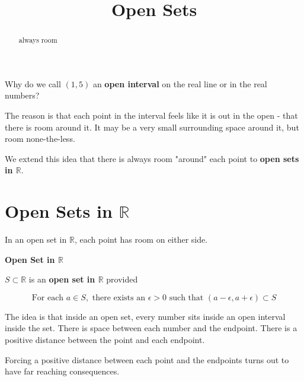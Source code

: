 \documentclass{ximera}
\title{Open Sets}
\begin{document}
\begin{abstract}
always room
\end{abstract}
\maketitle





Why do we call $(1, 5)$ an \textbf{open interval} on the real line or in the real numbers?



The reason is that each point in the interval feels like it is out in the open - that there is room around it.  It may be a very small surrounding space around it, but room none-the-less.  


We extend this idea that there is always room "around" each point to \textbf{open sets in $\mathbb{R}$}.






\section{Open Sets in $\mathbb{R}$}

In an open set in $\mathbb{R}$, each point has room on either side.  




\begin{definition}  \textbf{\textcolor{green!50!black}{Open Set in $\mathbb{R}$}}


$S \subset \mathbb{R}$ is an \textbf{open set in $\mathbb{R}$} provided 

\[
\text{For each } a \in S, \text{ there exists an } \epsilon > 0 \text{ such that }  (a - \epsilon, a + \epsilon) \subset S
\]

\end{definition}



\begin{idea}

The idea is that inside an open set, every number sits inside an open interval inside the set.  There is space between each number and the endpoint. There is a positive distance between the point and each endpoint.
\end{idea}

Forcing a positive distance between each point and the endpoints turns out to have far reaching consequences. \\
\end{document}
